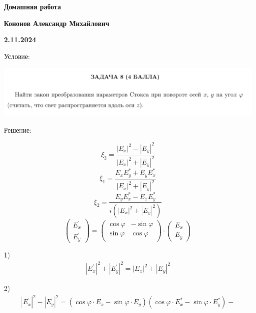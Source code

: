 \documentclass[12pt]{article}
\begin{document}
\begin{large}
\begin{center}
\LARGE \textbf{Домашняя работа}
\par
\LARGE \textbf{Кононов Александр Михайлович}
\par
    \textbf{2.11.2024}
\end{center}
\par Условие:
\par
\includegraphics[width=1\textwidth]{photo.png}
\par Решение:
\par
\par
\par
\[
    \xi_3 = \frac{|E_x|^2 - |E_y|^2}{|E_x|^2 + |E_y|^2}
\]
\[
    \xi_1 = \frac{E_x E_y^* + E_y E_x^*}{|E_x|^2 + |E_y|^2}
\]
\[
    \xi_2 = \frac{E_y E_x^* - E_x E_y^*}{i (|E_x|^2 + |E_y|^2)}
\]
\begin{equation*}
    \begin{pmatrix}
        E_{x}^{'} \\
        E_{y}^{'}
    \end{pmatrix}
    =
    \begin{pmatrix}
        \cos \varphi & -\sin \varphi \\
         \sin \varphi & \cos \varphi \\
    \end{pmatrix}
    \cdot
    \begin{pmatrix}
        E_{x} \\
        E_{y}
    \end{pmatrix}
\end{equation*}
\par 1)
\begin{eqnarray*}
    |E_{x}^{'}|^2 + |E_{y}^{'}|^2 = |E_{x}|^2 + |E_{y}|^2
\end{eqnarray*}
\par 2)
\begin{eqnarray*}
    |E_{x}^{'}|^2 - |E_{y}^{'}|^2 = \left( \cos \varphi \cdot E_x - \sin \varphi \cdot E_y \right)\left( \cos \varphi \cdot E_x^* - \sin \varphi \cdot E_y^* \right) - \\

\end{eqnarray*}
\end{large}
\end{document}
